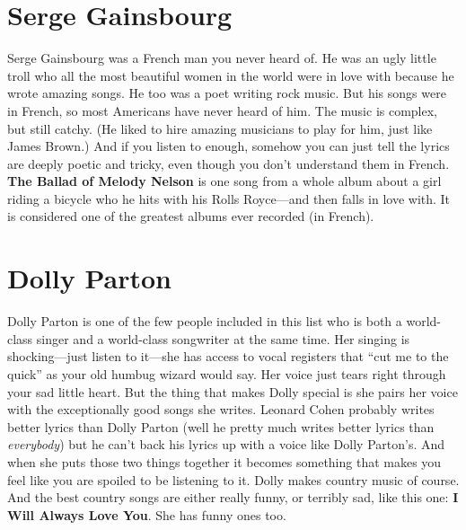 \documentclass[letterpaper,single]{article}
\begin{document}
\section{Serge Gainsbourg}
Serge Gainsbourg was a French man you never heard of. 
He was an ugly little troll who all the most beautiful women in the world were in love with because he wrote amazing songs. 
He too was a poet writing rock music.
But his songs were in French, so most Americans have never heard of him. 
The music is complex, but still catchy. (He liked to hire amazing musicians to play for him, just like James Brown.)
And if you listen to enough, somehow you can just tell the lyrics are deeply poetic and tricky, even though you don't understand them in French.
\textbf{The Ballad of Melody Nelson} is one song from a whole album about a girl riding a bicycle who he hits with his Rolls Royce---and then falls in love with. 
It is considered one of the greatest albums ever recorded (in French).

\section{Dolly Parton}
Dolly Parton is one of the few people included in this list who is both a world-class singer and a world-class songwriter at the same time.
Her singing is shocking---just listen to it---she has access to vocal registers that ``cut me to the quick'' as your old humbug wizard would say. 
Her voice just tears right through your sad little heart.
But the thing that makes Dolly special is she pairs her voice with the exceptionally good songs she writes.
Leonard Cohen probably writes better lyrics than Dolly Parton (well he pretty much writes better lyrics than \emph{everybody}) but he can't back his lyrics up with a voice like Dolly Parton's.
And when she puts those two things together it becomes something that makes you feel like you are spoiled to be listening to it.
Dolly makes country music of course. And the best country songs are either really funny, or terribly sad, like this one: \textbf{I Will Always Love You}.
She has funny ones too.
\end{document}
